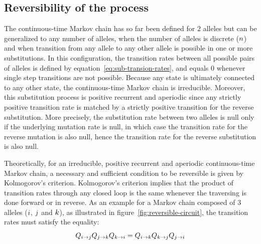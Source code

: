 \subsection{Reversibility of the process}
The continuous-time \gls{Markov chain} has so far been defined for $2$ \glspl{allele} but can be generalized to any number of \glspl{allele}, when the number of \glspl{allele} is discrete ($n$) and when transition from any \gls{allele} to any other \gls{allele} is possible in one or more \glspl{substitution}.
In this configuration, the transition rates between all possible pairs of \glspl{allele} is defined by equation~\ref{eq:sub-transion-rates}, and equals $0$ whenever single step transitions are not possible.
Because any state is ultimately connected to any other state, the continuous-time \gls{Markov chain} is irreducible.
Moreover, this \gls{substitution} process is positive recurrent and aperiodic since any strictly positive transition rate is matched by a strictly positive transition for the reverse \gls{substitution}.
More precisely, the \gls{substitution} rate between two \glspl{allele} is null only if the underlying mutation rate is null, in which case the transition rate for the reverse mutation is also null, hence the transition rate for the reverse \gls{substitution} is also null.

Theoretically, for an irreducible, positive recurrent and aperiodic continuous-time \gls{Markov chain}, a necessary and sufficient condition to be reversible is given by Kolmogorov's criterion.
Kolmogorov's criterion implies that the product of transition rates through any closed loop is the same whenever the traversing is done forward or in reverse.
As an example for a \gls{Markov chain} composed of $3$ \glspl{allele} (${i}$, ${j}$ and ${k}$), as illustrated in figure~\ref{fig:reversible-circuit}, the transition rates must satisfy the equality:
\begin{equation}
    Q_{{i} \to {j}}Q_{{j} \to {k}}Q_{{k} \to {i}} = Q_{{i} \to {k}}Q_{{k} \to {j}}Q_{{j} \to {i}}
\end{equation}

